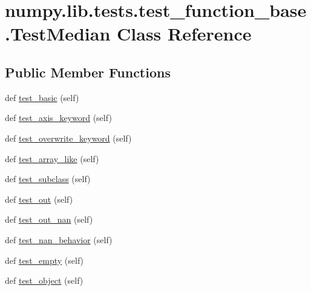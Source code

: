 \hypertarget{classnumpy_1_1lib_1_1tests_1_1test__function__base_1_1TestMedian}{}\section{numpy.\+lib.\+tests.\+test\+\_\+function\+\_\+base.\+Test\+Median Class Reference}
\label{classnumpy_1_1lib_1_1tests_1_1test__function__base_1_1TestMedian}
\subsection*{Public Member Functions}
\begin{DoxyCompactItemize}
\item 
def \hyperlink{classnumpy_1_1lib_1_1tests_1_1test__function__base_1_1TestMedian_acd05f1bfe5ce64f599cfc06b910812e0}{test\+\_\+basic} (self)
\item 
def \hyperlink{classnumpy_1_1lib_1_1tests_1_1test__function__base_1_1TestMedian_a809fe633b3644aef02f0913e741fee0e}{test\+\_\+axis\+\_\+keyword} (self)
\item 
def \hyperlink{classnumpy_1_1lib_1_1tests_1_1test__function__base_1_1TestMedian_ae582df4b5a0035688d02218ca7732337}{test\+\_\+overwrite\+\_\+keyword} (self)
\item 
def \hyperlink{classnumpy_1_1lib_1_1tests_1_1test__function__base_1_1TestMedian_ac184696ffbadd607d3bceeb70fa48ed7}{test\+\_\+array\+\_\+like} (self)
\item 
def \hyperlink{classnumpy_1_1lib_1_1tests_1_1test__function__base_1_1TestMedian_ab2f873094355732d05e08b1038e68e47}{test\+\_\+subclass} (self)
\item 
def \hyperlink{classnumpy_1_1lib_1_1tests_1_1test__function__base_1_1TestMedian_a83a1b5d61ac3711697f2982a4986f5b1}{test\+\_\+out} (self)
\item 
def \hyperlink{classnumpy_1_1lib_1_1tests_1_1test__function__base_1_1TestMedian_a1badf4ff8356454a7e8bf60ff19f121f}{test\+\_\+out\+\_\+nan} (self)
\item 
def \hyperlink{classnumpy_1_1lib_1_1tests_1_1test__function__base_1_1TestMedian_a71048a3145402ccac355c48602fa38ae}{test\+\_\+nan\+\_\+behavior} (self)
\item 
def \hyperlink{classnumpy_1_1lib_1_1tests_1_1test__function__base_1_1TestMedian_aa8e3d49e5359405208f019c8a52c3131}{test\+\_\+empty} (self)
\item 
def \hyperlink{classnumpy_1_1lib_1_1tests_1_1test__function__base_1_1TestMedian_ae29719b89e90fc8a8c746a798dab8b3d}{test\+\_\+object} (self)

\end{DoxyCompactItemize}
